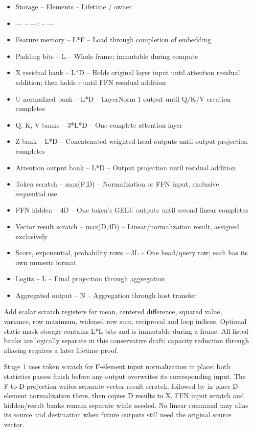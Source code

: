 \documentclass[11pt,a4paper]{article}
\begin{document}
\begin{itemize}
\item Storage -- Elements -- Lifetime / owner
\item --- -- ---: -- ---
\item Feature memory -- L*F -- Load through completion of embedding
\item Padding bits -- L -- Whole frame; immutable during compute
\item X residual bank -- L*D -- Holds original layer input until attention residual addition; then holds r until FFN residual addition
\item U normalized bank -- L*D -- LayerNorm 1 output until Q/K/V creation completes
\item Q, K, V banks -- 3*L*D -- One complete attention layer
\item Z bank -- L*D -- Concatenated weighted-head outputs until output projection completes
\item Attention output bank -- L*D -- Output projection until residual addition
\item Token scratch -- max(F,D) -- Normalization or FFN input, exclusive sequential use
\item FFN hidden -- 4D -- One token's GELU outputs until second linear completes
\item Vector result scratch -- max(D,4D) -- Linear/normalization result, assigned exclusively
\item Score, exponential, probability rows -- 3L -- One head/query row; each has its own numeric format
\item Logits -- L -- Final projection through aggregation
\item Aggregated output -- N -- Aggregation through host transfer
\end{itemize}


Add scalar scratch registers for mean, centered difference, squared value, variance, row maximum, widened row sum, reciprocal and loop indices. Optional static-mask storage contains L*L bits and is immutable during a frame. All listed banks are logically separate in this conservative draft; capacity reduction through aliasing requires a later lifetime proof.

Stage 1 uses token scratch for F-element input normalization in place: both statistics passes finish before any output overwrites its corresponding input. The F-to-D projection writes separate vector result scratch, followed by in-place D-element normalization there, then copies D results to X. FFN input scratch and hidden/result banks remain separate while needed. No linear command may alias its source and destination when future outputs still need the original source vector.
\end{document}
